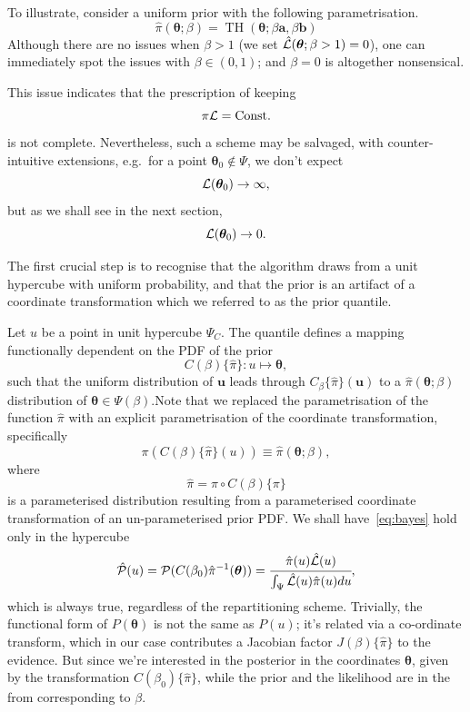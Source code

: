 \documentclass[usenatbib]{mnras}
\DeclareMathOperator{\TopHat}{TH}
\begin{document}
To illustrate, consider a uniform prior with the following
parametrisation.
\begin{equation}
  \hat{\pi}(\bm{\theta}; \beta) = \TopHat(\bm{\theta}; \beta \bm{a}, \beta \bm{b})
\end{equation}
Although there are no issues when \(\beta>1\) (we set
\({\cal\hat{L}}(\bm{\theta}; \beta>1)=0\)), one can immediately
spot the issues with \(\beta \in (0,1)\); and \(\beta=0\) is
altogether nonsensical.

This issue indicates that the prescription of keeping
\[\pi {\cal L} = \text{Const.}\] is not complete. Nevertheless, such a
scheme may be salvaged, with counter-intuitive extensions, e.g.~for a
point \(\bm{\theta}_{0} \notin \Psi\), we don't expect
\[{\cal L}(\bm{\theta}_{0}) \rightarrow \infty,\] but as we shall see in
the next section, \[{\cal L}(\bm{\theta}_{0}) \rightarrow 0.\]

The first crucial step is to recognise that the algorithm draws
from a unit hypercube with uniform probability, and that the prior
is an artifact of a coordinate transformation which we referred to
as the prior quantile.

Let \(u\) be a point in unit hypercube \(\Psi_{C}\). The quantile
defines a mapping functionally dependent on the PDF of the prior
\[C(\beta)\lbrace \hat{\pi}\rbrace:u \mapsto \bm{\theta},\] such that
the uniform distribution of \(\bm{u}\) leads through
\(C_{\beta}\{\hat{\pi}\}(\bm{u})\) to a \(\hat{\pi}(\bm{\theta};\beta)\)
distribution of \(\bm{\theta} \in\Psi(\beta)\).Note that we replaced the
parametrisation of the function \(\hat{\pi}\) with an explicit
parametrisation of the coordinate transformation, specifically
\begin{equation}
  \pi(C(\beta)\{\hat{\pi}\}(u)) \equiv \hat{\pi}(\bm{\theta}; \beta),
\end{equation}
where 
\begin{equation}
  \hat{\pi} =  \pi \circ C(\beta) \{ \pi \} 
\end{equation}
is a parameterised distribution resulting from a parameterised
coordinate transformation of an un-parameterised prior PDF. We shall
have~\vref{eq:bayes} hold only in the hypercube
\begin{equation}
{\cal \hat{P}}(u) = {\cal P}(C(\beta_{0}){\hat{\pi}}^{-1}(\bm{\theta})) = \cfrac{\hat{\pi} (u) {\cal \hat{L}}(u)}{\int_{\Psi}{\cal \hat{L}}(u) \hat{\pi}(u) du},
\end{equation}
which is always true, regardless of the repartitioning
scheme. Trivially, the functional form of \(P(\bm{\theta})\) is not the same
as \(P(u)\); it's related via a co-ordinate transform, which in our
case contributes a Jacobian factor \(J(\beta)\{\hat{\pi}\}\) to the
evidence. But since we're interested in the posterior in the
coordinates \(\bm{\theta}\), given by the transformation \(C(\beta_{0})\{\hat{\pi}\}\),
while the prior and the likelihood are in the from corresponding
to \(\beta\).
\end{document}
